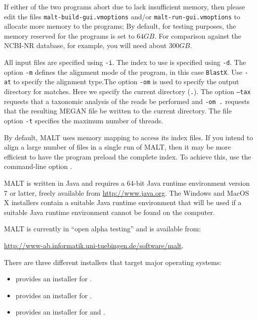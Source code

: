 \documentclass[11pt]{article}
\newcommand\MALT{{\sf MALT}\xspace}
\begin{document}
If either of the two programs abort due to lack insufficient memory, then please edit the files {\tt malt-build-gui.vmoptions} and/or {\tt malt-run-gui.vmoptions} to allocate more memory to the programs;
By default, for testing purposes, the memory reserved for the programs is set to $64GB$. 
For comparison against the NCBI-NR database, for example, you will  need about $300GB$.

All input files are specified using {\tt -i}.  The index to use is specified using {\tt -d}. The option {\tt -m} defines the alignment mode of the program, in this
case {\tt BlastX}. Use {\tt -at} to specify the alignment type.The option {\tt -om} is used to specify the output directory for matches.
Here we specify the current directory ({\tt .}). The option {\tt --tax} requests that a taxonomic analysis of the reads be performed and {\tt -om .}
requests that the resulting MEGAN file be written to the current directory.
The file option {\tt -t} specifies the maximum number of threads.

By default, \MALT uses memory mapping to access its index files. If you intend to align a large number of files in a single run of \MALT,
then it may be more efficient to have the program preload the complete index. To achieve this, use the command-line option .



\MALT is written in Java and requires a 64-bit Java runtime environment
version 7 or latter, freely available from \url{http://www.java.org}.
The Windows and MacOS X installers contain a suitable Java runtime environment that will be used if
a suitable Java runtime environment cannot be found on the computer.

\MALT is currently in ``open alpha testing'' and is available from:

\url{http://www-ab.informatik.uni-tuebingen.de/software/malt}.

There are three different installers that target major operating systems:
\begin{itemize}
\item {} provides an installer  for .
\item {} provides an installer for .
\item {} provides an installer for  and  .
\end{itemize}
\end{document}
